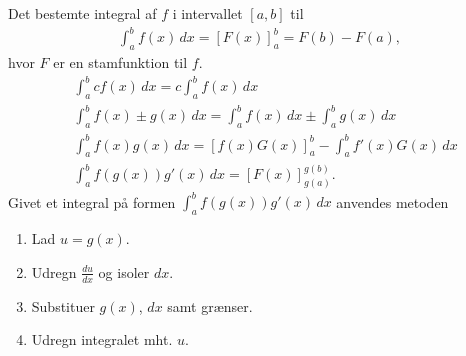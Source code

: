 Det bestemte integral af $f$ i intervallet $[a,b]$ til
\begin{align*}
\int_a^b f(x)\, dx =[F(x)]_a^b=F(b)-F(a),
\end{align*}
hvor $F$ er en stamfunktion til $f$.
\begin{align*}
&\int_a^b cf(x) \, d x=c\int_a^b f(x)\, dx\\
&\int_a^b \!\!f(x)\pm g(x) \, d x=\!\!\!\!\int_a^b\!\!f(x)\, dx\pm \!\!\!\!\int_a^b\!\! g(x) \, dx\\
&\int_a^b\!\!\!\!\! \!\!\!f(x)g(x)\, dx\!\!=\!\![f(x)G(x)]_a^b\!\!-\!\!\!\!\int_a^b\!\!\!\!\!\!\!\! f'(x)G(x)\, dx\\
&\int_a^b f(g(x))g'(x) \, dx=[F(x)]_{g(a)}^{g(b)}.
\end{align*}
Givet et integral på formen $\int_a^b f(g(x))g'(x)\, dx$ anvendes metoden
	\begin{enumerate}
	\item Lad $u=g(x)$.
	\item Udregn $\frac{du}{dx}$ og isoler $dx$.
	\item Substituer $g(x)$, $dx$ samt grænser.
	\item Udregn integralet mht. $u$.
\end{enumerate}
\vfill